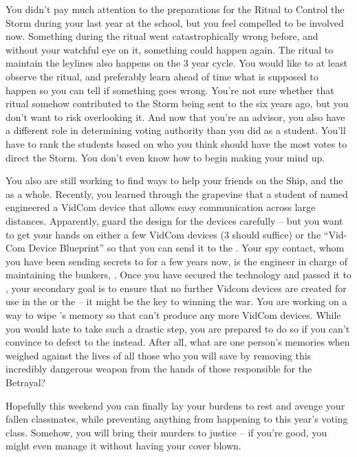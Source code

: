 \documentclass[char]{GL2020}
\begin{document}
You didn't pay much attention to the preparations for the Ritual to Control the Storm during your last year at the school, but you feel compelled to be involved now. Something during the ritual went catastrophically wrong before, and without your watchful eye on it, something could happen again. The ritual to maintain the leylines also happens on the 3 year cycle. You would like to at least observe the ritual, and preferably learn ahead of time what is supposed to happen so you can tell if something goes wrong. You're not sure whether that ritual somehow contributed to the Storm being sent to the \pShip{} six years ago, but you don't want to risk overlooking it. And now that you're an advisor, you also have a different role in determining voting authority than you did as a student. You'll have to rank the \pTech{} students based on who you think should have the most votes to direct the Storm. You don't even know how to begin making your mind up.

You also are still working to find ways to help your friends on the \cSavFlet{\full} Ship, and the \pShip{} as a whole. Recently, you learned through the grapevine that a student of \pTech{} named \cTechStar{} engineered a VidCom device that allows easy communication across large distances. Apparently, \cTechStar{\they} guard\cTechStar{\plural} the design for the devices carefully -- but you want to get your hands on either a few VidCom devices (3 should suffice) or the ``Vid-Com Device Blueprint'' so that you can send it to the \pShip{}. Your \pShip{} spy contact, whom you have been sending secrets to for a few years now, is the engineer in charge of maintaining the bunkers, \cBunker{\full}. Once you have secured the technology and passed it to \cBunker{}, your secondary goal is to ensure that no further Vidcom devices are created for use in the \pTech{} or the \pFarm{} – it might be the key to \pShip{} winning the war. You are working on a way to wipe \cTechStar{}'s memory so that \cTechStar{\they} can't produce any more VidCom devices. While you would hate to take such a drastic step, you are prepared to do so if you can't convince \cTechStar{} to defect to the \pShip{} instead. After all, what are one person's memories when weighed against the lives of all those who you will save by removing this incredibly dangerous weapon from the hands of those responsible for the Betrayal?

Hopefully this weekend you can finally lay your burdens to rest and avenge your fallen classmates, while preventing anything from happening to this year's voting class. Somehow, you will bring their murders to justice -- if you're good, you might even manage it without having your cover blown.
\end{document}

